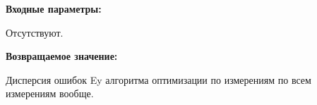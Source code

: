 \textbf{Входные параметры:}

Отсутствуют.

\textbf{Возвращаемое значение:}

Дисперсия ошибок Ey алгоритма оптимизации по измерениям по всем измерениям вообще.